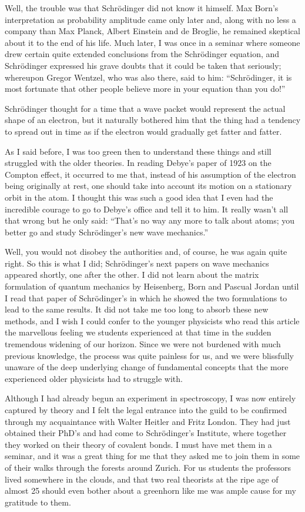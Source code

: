 \documentclass[12pt]{article}
\begin{document}
Well, the trouble was that Schr\"odinger did not know it himself. Max Born's interpretation as probability amplitude came only later and, along with no less a company than Max Planck, Albert Einstein and de Broglie, he remained skeptical about it to the end of his life. Much later, I was once in a seminar where someone drew certain quite extended conclusions from the Schr\"odinger equation, and Schr\"odinger expressed his grave doubts that it could be taken that seriously; whereupon Gregor Wentzel, who was also there, said to him: ``Schr\"odinger, it is most fortunate that other people believe more in your equation than you do!''

Schr\"odinger thought for a time that a wave packet would represent the actual shape of an electron, but it naturally bothered him that the thing had a tendency to spread out in time as if the electron would gradually get fatter and fatter.

As I said before, I was too green then to understand these things and still struggled with the older theories. In reading Debye's paper of 1923 on the Compton effect, it occurred to me that, instead of
his assumption of the electron being originally at rest, one should take into account its motion on a stationary orbit in the atom. I thought this was such a good idea that I even had the incredible courage to go to Debye's office and tell it to him. It really wasn't all that wrong but he only said: ``That's no way any more to talk about atoms; you better go and study Schr\"odinger's new wave mechanics.''

Well, you would not disobey the authorities and, of course, he was again quite right. So this is what I did; Schr\"odinger's next papers on wave mechanics appeared shortly, one after the other. I did not learn about the matrix formulation of quantum mechanics by Heisenberg, Born and Pascual Jordan until I read that paper of Schr\"odinger's in which he showed the two formulations to lead to the same results. It did not take me too long to absorb these new methods, and I wish I could confer to the younger physicists who read this article the marvellous feeling we students experienced at that time in the sudden tremendous widening of our horizon. Since we were not burdened with much previous knowledge, the process was quite painless for us, and we were blissfully unaware of the deep underlying change of fundamental concepts that the more experienced older physicists had to struggle with.

Although I had already begun an experiment in spectroscopy, I was now entirely captured by theory and I felt the legal entrance into the guild to be confirmed through my acquaintance with Walter Heitler and Fritz London. They had just obtained their PhD's and had come to Schr\"odinger's Institute, where together they worked on their theory of covalent bonds. I must have met them in a seminar, and it was a great thing for me that they asked me to join them in some of their walks through the forests around Zurich. For us students the professors lived somewhere in the clouds, and that two real theorists at the ripe age of almost 25 should even bother about a greenhorn like me was ample cause for my gratitude to them.
\end{document}
